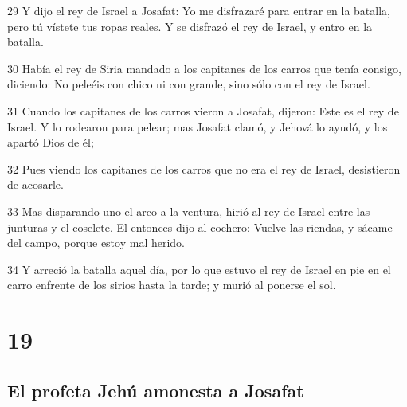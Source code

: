 \par 29 Y dijo el rey de Israel a Josafat: Yo me disfrazaré para entrar en la batalla, pero tú vístete tus ropas reales. Y se disfrazó el rey de Israel, y entro en la batalla.
\par 30 Había el rey de Siria mandado a los capitanes de los carros que tenía consigo, diciendo: No peleéis con chico ni con grande, sino sólo con el rey de Israel.
\par 31 Cuando los capitanes de los carros vieron a Josafat, dijeron: Este es el rey de Israel. Y lo rodearon para pelear; mas Josafat clamó, y Jehová lo ayudó, y los apartó Dios de él;
\par 32 Pues viendo los capitanes de los carros que no era el rey de Israel, desistieron de acosarle.
\par 33 Mas disparando uno el arco a la ventura, hirió al rey de Israel entre las junturas y el coselete. El entonces dijo al cochero: Vuelve las riendas, y sácame del campo, porque estoy mal herido.
\par 34 Y arreció la batalla aquel día, por lo que estuvo el rey de Israel en pie en el carro enfrente de los sirios hasta la tarde; y murió al ponerse el sol. 

\chapter{19}

\section*{El profeta Jehú amonesta a Josafat}

